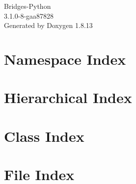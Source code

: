 \documentclass[twoside]{book}
\newcommand{\+}{\discretionary{\mbox{\scriptsize$\hookleftarrow$}}{}{}}
\newcommand{\clearemptydoublepage}{%
  \newpage{\pagestyle{empty}\cleardoublepage}%
}
\begin{document}
\hypersetup{pageanchor=false,
             bookmarksnumbered=true,
             pdfencoding=unicode
            }
\begin{titlepage}
\vspace*{7cm}
\begin{center}%
{\Large Bridges-\/\+Python \\[1ex]\large 3.\+1.\+0-\/8-\/gaa87828 }\\
\vspace*{1cm}
{\large Generated by Doxygen 1.8.13}\\
\end{center}
\end{titlepage}
\clearemptydoublepage
{}
\tableofcontents
\clearemptydoublepage
{}
\hypersetup{pageanchor=true}

\chapter{Namespace Index}

\chapter{Hierarchical Index}

\chapter{Class Index}

\chapter{File Index}

\end{document}
